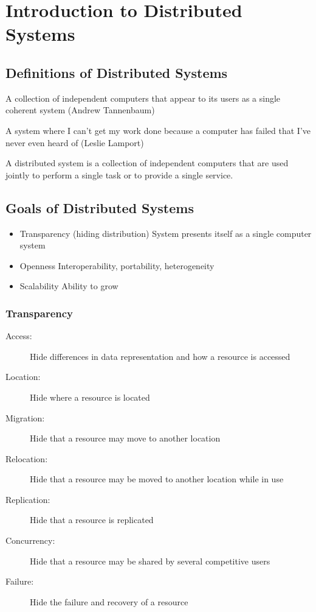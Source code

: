 \section{Introduction to Distributed Systems}

\subsection{Definitions of Distributed Systems}
\begin{leftbar}
	A collection of independent computers that appear to its users as a single coherent system (Andrew Tannenbaum)
\end{leftbar}
\begin{leftbar}
	A system where I can't get my work done because a computer has failed that I've never even heard of (Leslie Lamport)
\end{leftbar}
A distributed system is a collection of independent computers that are used jointly to perform a single task or to provide a single service.

\subsection{Goals of Distributed Systems}
\begin{itemize}
	\item Transparency (hiding distribution)
	\subitem System presents itself as a single computer system
	\item Openness
	\subitem Interoperability, portability, heterogeneity
	\item Scalability
	\subitem Ability to grow
\end{itemize}

\subsubsection{Transparency}
\begin{description}
	\item[Access:] Hide differences in data representation and how a resource is accessed
	\item[Location:] Hide where a resource is located
	\item[Migration:] Hide that a resource may move to another location
	\item[Relocation:] Hide that a resource may be moved to another location while in use
	\item[Replication:] Hide that a resource is replicated
	\item[Concurrency:] Hide that a resource may be shared by several competitive users
	\item[Failure:] Hide the failure and recovery of a resource
\end{description}

